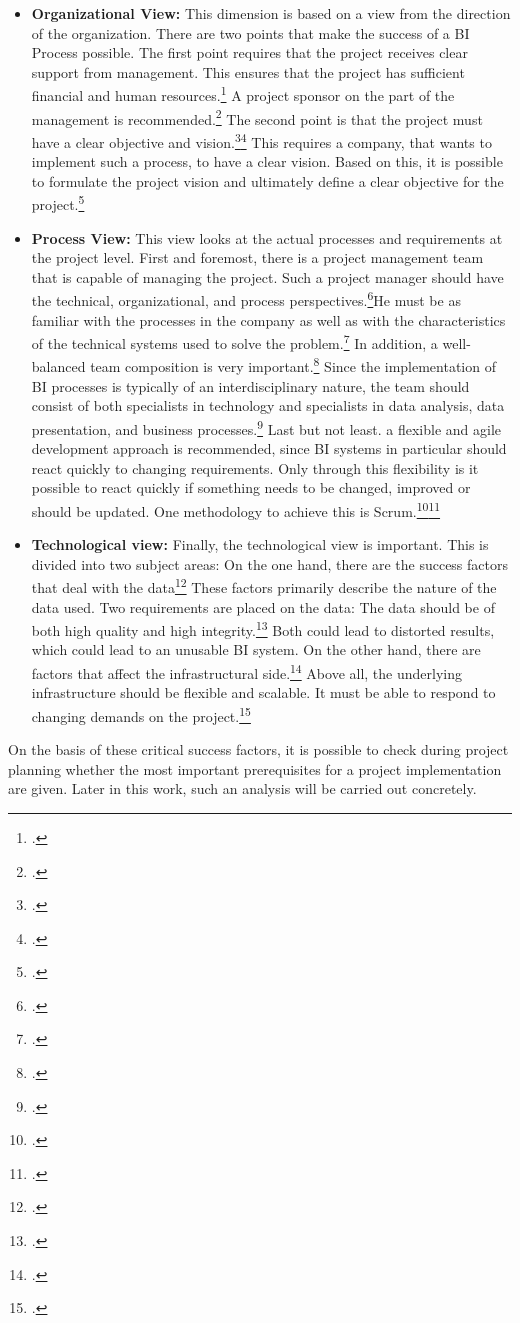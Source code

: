 \begin{itemize}
    \item \textbf{Organizational View: }This dimension is based on a view from the direction of the organization.
    There are two points that make the success of a \ac{BI} Process possible. The first point requires that the project
    receives clear support from management. This ensures that the project has sufficient financial and human resources.\footcite[Cf.][p. 98]{watson2007current}
    A project sponsor on the part of the management is recommended.\footcite[Cf.][pp. 87]{yeoh2008managing}
    The second point is that the project must have a clear objective and vision.\footcite[Cf.][pp. 87]{yeoh2008managing}\footcite[Cf.][p. 50]{villamarin2017key}
    This requires a company, that wants to implement such a process, to have a clear vision.
    Based on this, it is possible to formulate the project vision and ultimately define a clear
    objective for the project.\footcite[Cf.][pp. 87]{yeoh2008managing}
    \item \textbf{Process View: }This view looks at the actual processes and requirements at the project level.
    First and foremost, there is a project management team that is capable of managing the project. Such a project manager should have the
    technical, organizational, and process perspectives.\footcite[Cf.][p. 27]{yeoh2010critical}He must be as familiar with the
    processes in the company as well as with the characteristics of the technical systems used to solve the problem.\footcite[Cf.][pp. 88]{yeoh2008managing}
    In addition, a well-balanced team composition is very important.\footcite[Cf.][pp. 87]{yeoh2008managing}
    Since the implementation of BI processes is typically of an
    interdisciplinary nature, the team should consist of both specialists in technology and specialists in
    data analysis, data presentation, and business processes.\footcite[Cf.][Fig. 7]{muntean2013agile} Last but not least.
    a flexible and agile development approach is recommended, since \ac{BI} systems in particular should react quickly to changing requirements.
    Only through this flexibility is it possible to react quickly if something needs to be changed, improved
    or should be updated. One methodology to achieve this is
    Scrum.\footcite[Cf.][p. 164]{isik2011business}\footcite[Cf.][p. 3817]{knabke2013understanding}
    \item \textbf{Technological view: }Finally, the technological view is important. This is divided into two
    subject areas: On the one hand, there are the success factors that deal with the data\footcite[Cf.][Fig. 1]{yeoh2010critical}
    These factors primarily describe the nature of the data used.
    Two requirements are placed on the data: The data should be of both high quality and high
    integrity.\footcite[Cf.][p. 163]{isik2011business} Both could lead to distorted results,
    which could lead to an unusable BI system. On the other hand, there are factors that affect the infrastructural side.\footcite[Cf.][Fig. 1]{yeoh2010critical}
    Above all, the underlying infrastructure should be flexible and
    scalable. It must be able to respond to changing demands on the project.\footcite[Cf.][pp. 89]{yeoh2008managing}
\end{itemize}

On the basis of these critical success factors, it is possible to check during project planning whether the most important
prerequisites for a project implementation are given. Later in this work, such an analysis will be carried out concretely.